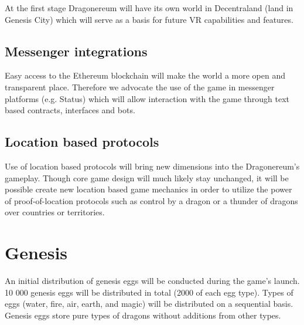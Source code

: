 \documentclass[12pt]{article}
\begin{document}
At the first stage Dragonereum will have its own world in Decentraland (land in Genesis City) which will serve as a basis for future VR capabilities and features.\par


\vspace{\baselineskip}
 \subsection{Messenger integrations}\label{Messenger integrations} \par

Easy access to the Ethereum blockchain will make the world a more open and transparent place. Therefore we advocate the use of the game in messenger platforms (e.g. Status) which will allow interaction with the game through text based contracts, interfaces and bots.\par


\vspace{\baselineskip}
 \subsection{Location based protocols}\label{Location based protocols} \par

Use of location based protocols will bring new dimensions into the Dragonereum’s gameplay. Though core game design will much likely stay unchanged, it will be possible create new location based game mechanics in order to utilize the power of proof-of-location protocols such as control by a dragon or a thunder of dragons over countries or territories.\\



\newpage
\par

\section{Genesis}
 \label{Genesis}  \par

An initial distribution of genesis eggs will be conducted during the game’s launch. 10 000 genesis eggs will be distributed in total (2000 of each egg type). Types of eggs (water, fire, air, earth, and magic) will be distributed on a sequential basis. Genesis eggs store pure types of dragons without additions from other types.\par
\end{document}
